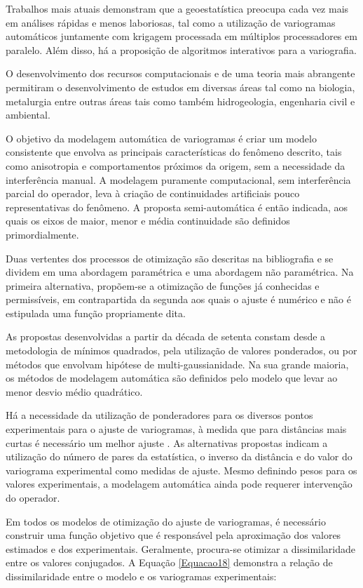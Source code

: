 Trabalhos mais atuais demonstram que a geoestatística preocupa cada vez mais em análises rápidas e menos laboriosas, tal como a utilização de variogramas automáticos juntamente com krigagem processada em múltiplos processadores em paralelo. Além disso, há a proposição de algoritmos interativos para a variografia. 

O desenvolvimento dos recursos computacionais e de uma teoria mais abrangente  permitiram o desenvolvimento de estudos em diversas áreas tal como na biologia, metalurgia entre outras áreas tais como também hidrogeologia, engenharia civil e ambiental. 

O objetivo da modelagem automática de variogramas é criar um modelo consistente que envolva as principais características do fenômeno descrito, tais como anisotropia e comportamentos próximos da origem, sem a necessidade da interferência manual. A modelagem puramente computacional, sem interferência parcial do operador, leva à criação de continuidades artificiais pouco representativas do fenômeno. A proposta semi-automática é então indicada, aos quais os eixos de maior, menor e média continuidade são definidos primordialmente. 

Duas vertentes dos processos de otimização são descritas na bibliografia e se dividem em uma abordagem paramétrica e uma abordagem não paramétrica. Na primeira alternativa, propõem-se a otimização de funções já conhecidas e permissíveis, em contrapartida da segunda aos quais o ajuste é numérico e não é estipulada uma função propriamente dita. 

As propostas desenvolvidas a partir da década de setenta constam desde a metodologia de mínimos quadrados, pela utilização de valores ponderados, ou por métodos que envolvam hipótese de multi-gaussianidade.  
Na sua grande maioria, os métodos de modelagem automática são definidos pelo modelo que levar ao menor desvio médio quadrático. 

Há a necessidade da utilização de ponderadores para os diversos pontos experimentais para o ajuste de variogramas, à medida que para distâncias mais curtas é necessário um melhor ajuste . As alternativas propostas indicam a utilização do número de pares da estatística, o inverso da distância e do valor do variograma experimental como medidas de ajuste. Mesmo definindo pesos para os valores experimentais, a modelagem automática ainda pode requerer intervenção do operador. 

Em todos os modelos de otimização do ajuste de variogramas, é necessário construir uma função objetivo que é responsável pela aproximação dos valores estimados e dos experimentais. Geralmente, procura-se otimizar a dissimilaridade entre os valores conjugados. A Equação \ref{Equacao18} demonstra a relação de dissimilaridade entre o modelo e os variogramas experimentais:

